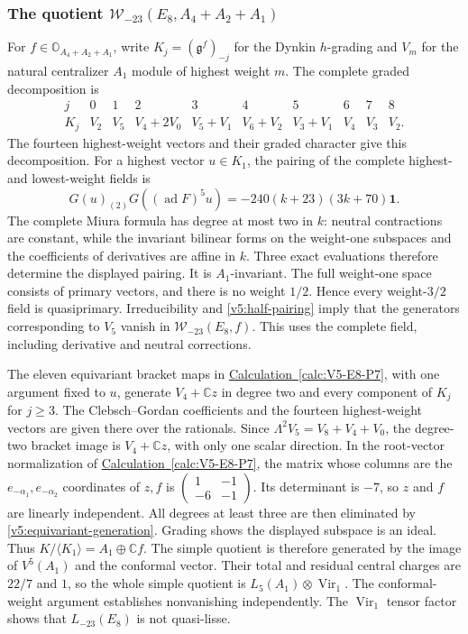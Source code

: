 \documentclass[11pt,a4paper]{amsart}
\numberwithin{equation}{section}
\theoremstyle{definition}
\theoremstyle{remark}
\newcommand{\C}{\mathbb C}
\newcommand{\g}{\mathfrak g}
\newcommand{\OO}{\mathbb O}
\newcommand{\Vir}{\operatorname{Vir}}
\newcommand{\ad}{\operatorname{ad}}
\begin{document}
\subsubsection{\texorpdfstring{The quotient $\mathcal W_{-23}(E_8,A_4+A_2+A_1)$}{The quotient W-23(E8,A4+A2+A1)}}
For $f\in\OO_{A_4+A_2+A_1}$, write $K_j=(\g^f)_{-j}$ for the Dynkin $h$-grading
and $V_m$ for the natural centralizer $A_1$ module of highest weight $m$.
The complete graded decomposition is
$$
\begin{array}{c|ccccccccc}
j&0&1&2&3&4&5&6&7&8\\\hline
K_j&V_2&V_5&V_4+2V_0&V_5+V_1&V_6+V_2&V_3+V_1&V_4&V_3&V_2.
\end{array}
$$
The fourteen highest-weight vectors and their graded character give
this decomposition.
For a highest vector $u\in K_1$, the pairing of the complete highest- and lowest-weight fields is
$$
 G(u)_{(2)}G((\ad F)^5u)=-240(k+23)(3k+70)\mathbf1.
$$
The complete Miura formula has degree at most two in $k$: neutral
contractions are constant, while the invariant bilinear forms on the
weight-one subspaces and the coefficients of derivatives are affine in $k$. Three exact evaluations therefore determine the displayed
pairing. It is $A_1$-invariant. The full weight-one space consists
of primary vectors, and there is no weight $1/2$. Hence every
weight-$3/2$ field is quasiprimary. Irreducibility and
\cref{v5:half-pairing} imply that the generators corresponding to $V_5$
vanish in $\mathcal W_{-23}(E_8,f)$. This uses the complete field, including derivative and neutral
corrections.

The eleven equivariant bracket maps in \hyperref[calc:V5-E8-P7]{Calculation~\ref*{calc:V5-E8-P7}}, with
one argument fixed to $u$, generate $V_4+\C z$ in degree two and every component
of $K_j$ for $j\ge3$. The Clebsch--Gordan coefficients and the fourteen highest-weight
vectors are given there over the rationals.
Since $\Lambda^2V_5=V_8+V_4+V_0$, the degree-two bracket image is
$V_4+\C z$, with only one scalar direction. In the root-vector
normalization of \hyperref[calc:V5-E8-P7]{Calculation~\ref*{calc:V5-E8-P7}},
the matrix whose columns are the $e_{-\alpha_1},e_{-\alpha_2}$ coordinates
of $z,f$ is $\left(\begin{smallmatrix}1&-1\\-6&-1\end{smallmatrix}\right)$.
Its determinant is $-7$, so $z$ and $f$ are linearly independent. All degrees at least
three are then eliminated by \cref{v5:equivariant-generation}. Grading
shows the displayed subspace is an ideal. Thus
$K/\langle K_1\rangle=A_1\oplus\C f$.
The simple quotient is therefore generated by the image of
$V^5(A_1)$ and the conformal vector.
Their total and residual central charges are $22/7$ and $1$, so the whole simple
quotient is $L_5(A_1)\otimes\Vir_1$. The conformal-weight argument establishes nonvanishing independently.
The $\Vir_1$ tensor factor shows that $L_{-23}(E_8)$ is not quasi-lisse.
\end{document}
